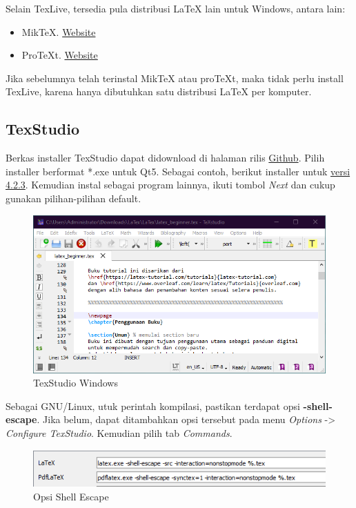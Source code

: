 \documentclass{book} %
\begin{document}
	Selain TexLive, tersedia pula distribusi \LaTeX{} lain untuk Windows, antara lain:
	\begin{itemize}
		\item MikTeX. \href{https://miktex.org/}{Website}
		\item ProTeXt. \href{https://www.tug.org/protext/}{Website}
	\end{itemize}

	Jika sebelumnya telah terinstal MikTeX atau proTeXt, maka tidak perlu install TexLive, karena hanya dibutuhkan satu distribusi \LaTeX{} per komputer.

	\subsection{TexStudio}

	Berkas installer TexStudio dapat didownload di halaman rilis \href{https://github.com/texstudio-org/texstudio/releases/}{Github}.
	Pilih installer berformat *.exe untuk Qt5.
	Sebagai contoh, berikut installer untuk \href{https://github.com/texstudio-org/texstudio/releases/download/4.2.3/texstudio-4.2.3-win-qt5.exe}{versi 4.2.3}.
	Kemudian instal sebagai program lainnya, ikuti tombol \textit{Next} dan cukup gunakan pilihan-pilihan default.

	\begin{figure}[!ht]
		\centering
		\includegraphics[width=400pt]{images/texstudiowin0}
		\caption{TexStudio Windows}
	\end{figure}

	Sebagai GNU/Linux, utuk perintah kompilasi, pastikan terdapat opsi \textbf{-shell-escape}.
	Jika belum, dapat ditambahkan opsi tersebut pada menu \textit{Options} -> \textit{Configure TexStudio}.
	Kemudian pilih tab \textit{Commands}.

	\begin{figure}[!ht]
		\centering
		\includegraphics[width=400pt]{images/texstudiowin1}
		\caption{Opsi Shell Escape}
	\end{figure}
\end{document}
